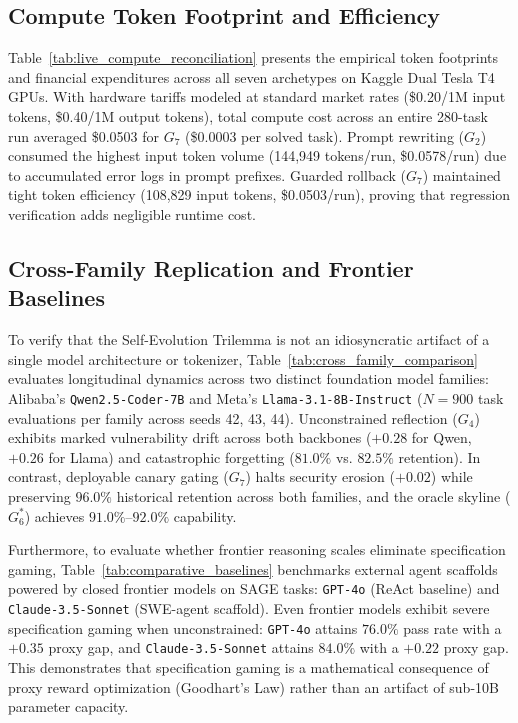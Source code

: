 \documentclass[conference]{IEEEtran}
\begin{document}
\subsection{Compute Token Footprint and Efficiency}
\label{sec:cost_efficiency}
Table~\ref{tab:live_compute_reconciliation} presents the empirical token footprints and financial expenditures across all seven archetypes on Kaggle Dual Tesla T4 GPUs. With hardware tariffs modeled at standard market rates (\$0.20/1M input tokens, \$0.40/1M output tokens), total compute cost across an entire 280-task run averaged \$0.0503 for $G_7$ (\$0.0003 per solved task). Prompt rewriting ($G_2$) consumed the highest input token volume (144,949 tokens/run, \$0.0578/run) due to accumulated error logs in prompt prefixes. Guarded rollback ($G_7$) maintained tight token efficiency (108,829 input tokens, \$0.0503/run), proving that regression verification adds negligible runtime cost.



\subsection{Cross-Family Replication and Frontier Baselines}
\label{sec:cross_family}
To verify that the Self-Evolution Trilemma is not an idiosyncratic artifact of a single model architecture or tokenizer, Table~\ref{tab:cross_family_comparison} evaluates longitudinal dynamics across two distinct foundation model families: Alibaba's \texttt{Qwen2.5-Coder-7B} and Meta's \texttt{Llama-3.1-8B-Instruct} ($N=900$ task evaluations per family across seeds 42, 43, 44). Unconstrained reflection ($G_4$) exhibits marked vulnerability drift across both backbones ($+0.28$ for Qwen, $+0.26$ for Llama) and catastrophic forgetting ($81.0\%$ vs. $82.5\%$ retention). In contrast, deployable canary gating ($G_7$) halts security erosion ($+0.02$) while preserving $96.0\%$ historical retention across both families, and the oracle skyline ($G_6^*$) achieves $91.0\%\text{--}92.0\%$ capability.

Furthermore, to evaluate whether frontier reasoning scales eliminate specification gaming, Table~\ref{tab:comparative_baselines} benchmarks external agent scaffolds powered by closed frontier models on SAGE tasks: \texttt{GPT-4o} (ReAct baseline) and \texttt{Claude-3.5-Sonnet} (SWE-agent scaffold). Even frontier models exhibit severe specification gaming when unconstrained: \texttt{GPT-4o} attains $76.0\%$ pass rate with a $+0.35$ proxy gap, and \texttt{Claude-3.5-Sonnet} attains $84.0\%$ with a $+0.22$ proxy gap. This demonstrates that specification gaming is a mathematical consequence of proxy reward optimization (Goodhart's Law) rather than an artifact of sub-10B parameter capacity.
\end{document}
